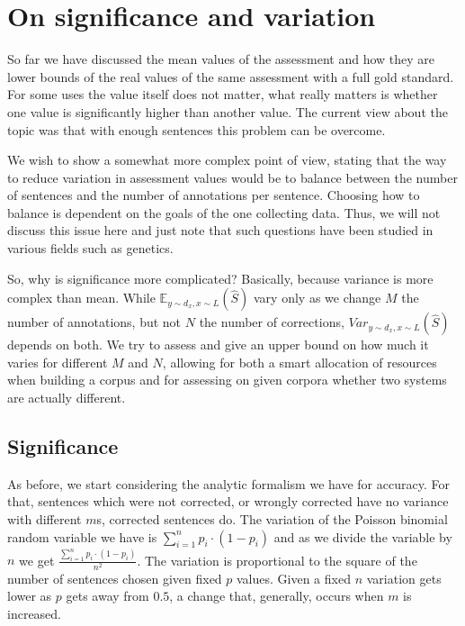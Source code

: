 \documentclass[11pt]{article}
\begin{document}
\section{On significance and variation}

So far we have discussed the mean values of the assessment and how they are lower bounds of the real values of the same assessment with a full gold standard. For some uses the value itself does not matter, what really matters is whether one value is significantly higher than another value. The current view about the topic was that with enough sentences this problem can be overcome.

We wish to show a somewhat more complex point of view, stating that the way to reduce variation in assessment values would be to balance between the number of sentences and the number of annotations per sentence. Choosing how to balance is dependent on the goals of the one collecting data. Thus, we will not discuss this issue here and just note that such questions have been studied in various fields such as genetics\cite{ionita2010optimal}.

So, why is significance more complicated? Basically, because variance is more complex than mean. While $\mathbb{E}_{y\sim d_x, x\sim L}\left(\hat{S}\right)$ vary only as we change $M$
the number of annotations, but not $N$ the number of corrections,
$Var_{y\sim d_x, x\sim L}(\hat{S})$ depends on both. We try to assess and give an upper
bound on how much it varies for different $M$ and $N$, allowing
for both a smart allocation of resources when building a corpus and
for assessing on given corpora whether two systems are actually different.

\subsection{Significance}

As before, we start considering the analytic formalism we have for accuracy. For that, sentences which were not corrected, or wrongly corrected have no variance with different $m$s, corrected sentences do. The variation of the Poisson binomial random variable we have is $\sum_{i=1}^{n}p_i\cdot\left(1-p_i\right)$ and as we divide the variable by $n$ we get $\frac{\sum_{i=1}^{n}p_i\cdot\left(1-p_i\right)}{n^2}$. 
The variation is proportional to the square of the number of sentences chosen given fixed $p$ values. Given a fixed $n$ variation gets lower as $p$ gets away from $0.5$, a change that, generally, occurs when $m$ is increased.
\end{document}
